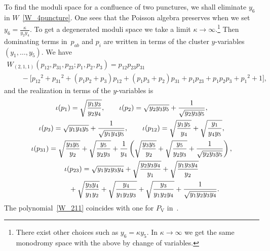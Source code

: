 \documentclass[10pt,a4paper]{amsart}
\numberwithin{equation}{section}
\begin{document}
To find the moduli space for a confluence of two punctures, we shall eliminate $y_6$ in $W$~\eqref{W_4puncture}. One sees that the Poisson algebra preserves when we set $y_6 = \frac{\kappa}{y_2 y_4}$. To get a degenerated moduli space we take a limit $\kappa\to \infty$.\footnote{There exist other choices such as $y_6=\kappa y_5$. In $\kappa\to \infty$ we get the same monodromy space with the above by change of variables.} Then dominating terms in~$p_{ab}$ and $p_i$ are written in terms of the cluster $y$-variables $(y_1,\dots,y_5)$. We have
\begin{gather}
 W_{(2,1,1)}(p_{12}, p_{31}, p_{23}; p_1, p_2, p_3) = p_{12} p_{23} p_{31}\nonumber \\
\qquad{}- \big[ {p_{12}}^2 + {p_{31}}^2 + ( p_1 p_2 + p_3 ) p_{12} + ( p_1 p_3 + p_2 ) p_{31} + p_1 p_{23} + p_1 p_2 p_3+ {p_1}^2 + 1 \big], \label{W_211}
\end{gather}
and the realization in terms of the $y$-variables is
\begin{gather}
 \iota(p_1) = \sqrt{\frac{y_1 y_3}{y_2 y_4}}, \qquad \iota(p_2) = \sqrt{y_2 y_3 y_5} + \frac{1}{\sqrt{y_2 y_3 y_5}},\nonumber \\
 \iota(p_3) = \sqrt{y_1 y_4 y_5} +\frac{1}{\sqrt{y_1 y_4 y_5}}, \qquad \iota(p_{12}) = \sqrt{\frac{ y_1 y_5}{y_4}} + \sqrt{\frac{y_1}{y_4 y_5}},\nonumber \\
 \iota(p_{31}) = \sqrt{\frac{y_3 y_5}{y_2}} + \sqrt{\frac{y_5}{y_2 y_3}} +\frac{1}{y_4} \left( \sqrt{\frac{y_3 y_5}{y_2}} +\sqrt{\frac{y_5}{y_2 y_3}} + \frac{1}{\sqrt{y_2 y_3 y_5}} \right),\nonumber \\
 \iota(p_{23}) = \sqrt{y_1 y_2 y_3 y_4} +\sqrt{\frac{y_2 y_3 y_4}{y_1}} +\sqrt{\frac{y_1 y_3 y_4}{y_2}}\nonumber \\
\hphantom{\iota(p_{23}) =}{} + \sqrt{\frac{y_3 y_4}{y_1 y_2}} +\sqrt{\frac{y_4}{y_1 y_2 y_3}} + \sqrt{\frac{y_3}{y_1 y_2 y_4}} + \frac{1}{\sqrt{y_1 y_2 y_3 y_4}} . \label{py_211}
\end{gather}
The polynomial~\eqref{W_211} coincides with one for $P_{\mathrm{V}}$ in~\cite{vdPutSaito09a}.
\end{document}
